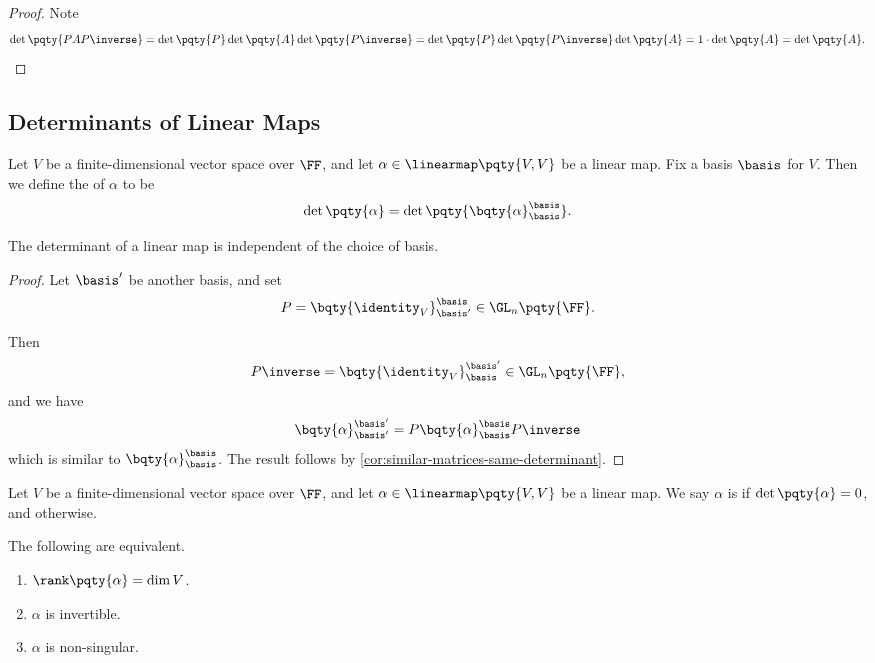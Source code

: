 \begin{proof}
    Note
    \[
        \det\pqty{P A P\inverse} = \det\pqty{P} \det\pqty{A} \det\pqty{P\inverse} = \det\pqty{P} \det\pqty{P\inverse} \det\pqty{A} = 1 \cdot \det\pqty{A} = \det\pqty{A}.
    \]
\end{proof}

\subsection{Determinants of Linear Maps}

\begin{definition}
    Let \(V\) be a finite-dimensional vector space over \(\FF\), and let \(\alpha \in \linearmap\pqty{V, V}\) be a linear map. Fix a basis \(\basis\) for \(V\). Then we define the  of \(\alpha\) to be
    \[
        \det\pqty{\alpha} = \det\pqty{\bqty{\alpha}_{\basis}^{\basis}}.
    \]
\end{definition}

\begin{proposition}
    The determinant of a linear map is independent of the choice of basis.
\end{proposition}

\begin{proof}
    Let \(\basis'\) be another basis, and set
    \[
        P = \bqty{\identity_V}_{\basis'}^{\basis} \in \GL_n\pqty{\FF}.
    \]

    Then
    \[
        P\inverse = \bqty{\identity_V}_{\basis}^{\basis'} \in \GL_n\pqty{\FF},
    \]
    and we have
    \[
        \bqty{\alpha}_{\basis'}^{\basis'} = P \bqty{\alpha}_{\basis}^{\basis} P\inverse
    \]
    which is similar to \(\bqty{\alpha}_{\basis}^{\basis}\). The result follows by \autoref{cor:similar-matrices-same-determinant}.
\end{proof}

\begin{definition}
    Let \(V\) be a finite-dimensional vector space over \(\FF\), and let \(\alpha \in \linearmap\pqty{V, V}\) be a linear map. We say \(\alpha\) is  if \(\det \pqty{\alpha} = 0\), and  otherwise.
\end{definition}

\begin{proposition}
    The following are equivalent.

    \begin{enumerate}[label=(\roman*)]
        \item \(\rank\pqty{\alpha} = \dim V\).
        \item \(\alpha\) is invertible.
        \item \(\alpha\) is non-singular.
    \end{enumerate}
\end{proposition}

